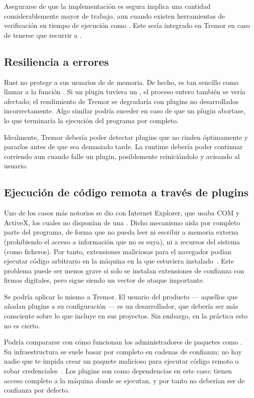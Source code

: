 Asegurarse de que la implementación es segura implica una cantidad
considerablemente mayor de trabajo, aun cuando existen herramientas de
verificación en tiempo de ejecución como . Este sería integrado
en Tremor en caso de tenerse que recurrir a \unsafe.

\subsection{Resiliencia a errores}

Rust no protege a sus usuarios de \leaks de memoria. De hecho, es tan sencillo
como llamar a la función . Si un plugin tuviera un \leak, el
proceso entero también se vería afectado; el rendimiento de Tremor se degradaría
con plugins no desarrollados incorrectamente. Algo similar podría suceder en
caso de que un plugin abortase, lo que terminaría la ejecución del programa por
completo.

Idealmente, Tremor debería poder detectar plugins que no rinden óptimamente y
pararlos antes de que sea demasiado tarde. La runtime debería poder continuar
corriendo aun cuando falle un plugin, posiblemente reiniciándolo y avisando al
usuario.

\subsection{Ejecución de código remota a través de plugins}

Uno de los casos más notorios se dio con Internet Explorer, que usaba COM y
ActiveX, los cuales no disponían de una \sandbox. Dicho mecanismo aisla por
completo parte del programa, de forma que no pueda leer ni escribir a memoria
externa (prohibiendo el acceso a información que no es suya), ni a recursos del
sistema (como ficheros). Por tanto, extensiones maliciosas para el navegador
podían ejecutar código arbitrario en la máquina en la que estuviera
instalado~\cite{iesandbox}. Este problema puede ser menos grave si solo se
instalan extensiones de confianza con firmas digitales, pero sigue siendo un
vector de ataque importante.

Se podría aplicar lo mismo a Tremor. El usuario del producto --- aquellos que
añadan plugins a su configuración --- es un desarrollador, que debería ser más
consciente sobre lo que incluye en sus proyectos. Sin embargo, en la práctica
esto no es cierto.

Podría compararse con cómo funcionan los administradores de paquetes como
. Su infraestructura se suele basar por completo en cadenas de
confianza; no hay nadie que te impida crear un paquete malicioso para ejecutar
código remoto o robar credenciales~\cite{npm1}\cite{npm2}. Los plugins son como
dependencias en este caso; tienen acceso completo a la máquina donde se
ejecutan, y por tanto no deberían ser de confianza por defecto.

